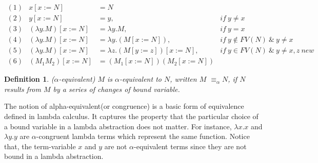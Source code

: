 \documentclass[a4paper,11pt,twoside]{report}
\newtheorem{def1}{\textbf{Definition}}[chapter]
\begin{document}

\begin{equation*}
\begin{array}{lrll}
(1)&x[x:=N]&=N & ~\\
(2)&y[x:=N]&=y,& if\ y\neq x\\
(3)&(\lambda y.M)[x:=N]&=\lambda y.M,& if\ y=x\\
(4)&(\lambda y.M)[x:=N]&=\lambda y.(M[x:=N]),& if\ y\notin FV(N)\ \& \ y\neq x\\
(5)&(\lambda y.M)[x:=N]&=\lambda z.(M[y:=z])[x:=N],& if\ y\in FV(N)\ \& \ y\neq x,z\  new\\
(6)&(M_1M_2)[x:=N] &= (M_1[x:=N])(M_2[x:=N])&
\end{array}
\end{equation*}

\begin{def1}\label{def1}
($\alpha$-equivalent) $M$ is $\alpha$-equivalent to $N$, written $M$ $\equiv_\alpha N$, if $N$ results from $M$ by a series of changes of bound variable.
\end{def1}

The notion of alpha-equivalent(or congruence) is a basic form of equivalence defined in lambda calculus. It captures the property that the particular choice of a bound variable in a lambda abstraction does not matter. For instance, $\lambda x.x$ and $\lambda y.y$ are $\alpha$-congruent lambda terms which represent the same function. Notice that, the term-variable $x$ and $y$ are not $\alpha$-equivalent terms since they are not bound in a lambda abstraction.
\end{document}

